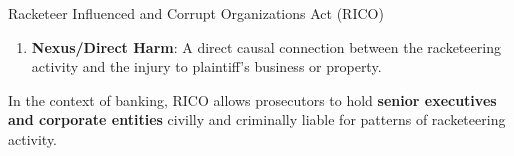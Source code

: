 \documentclass[10pt]{article}
\begin{document}
\begin{core}{Racketeer Influenced and Corrupt Organizations Act (RICO)}
\begin{enumerate}
\begin{itemize}
          \item Bank Fraud (\href{https://www.law.cornell.edu/uscode/text/18/1344}{\texttt{18 U.S.C. \S 1344}})

          \item Money Laundering (\href{https://www.law.cornell.edu/uscode/text/18/1956}{\texttt{18 U.S.C. \S\S 1956 \& 1957}})

          \item Financial Institution Fraud

          \item Bribery, extortion, and obstruction of justice

        \end{itemize}

        \item \textbf{Nexus/Direct Harm}: A direct causal connection between the racketeering activity and the injury to plaintiff's business or property.

      \end{enumerate}

      In the context of banking, RICO allows prosecutors to hold \textbf{senior executives and corporate entities} civilly and criminally liable for patterns of racketeering activity.

    \end{core}
\end{document}
